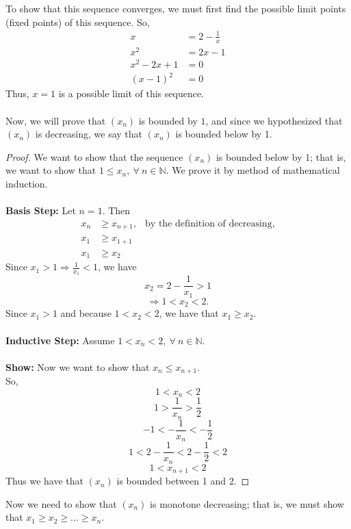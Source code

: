 \documentclass[12pt,letterpaper]{article}
\newcommand{\N}{\mathbb{N}}
\theoremstyle{case}
\theoremstyle{definition}
\begin{document}
\begin{enumerate}
\begin{enumerate}
\begin{enumerate}
			To show that this sequence converges, we must first find the possible limit points (fixed points) of this sequence. So,
			\begin{align*}
				x&=2-\frac{1}{x} \\
				x^2 &= 2x -1 \\
				x^2 - 2x + 1 &= 0 \\
				(x-1)^2 &= 0
			\end{align*}
			Thus, $x=1$ is a possible limit of this sequence.
			\\\\Now, we will prove that $(x_n)$ is bounded by $1$, and since we hypothesized that $(x_n)$ is decreasing, we say that $(x_n)$ is bounded below by 1. 
			\begin{proof}
				We want to show that the sequence $(x_n)$ is bounded below by 1; that is, we want to show that $1 \leq x_n,\ \forall\ n \in \N$. We prove it by method of mathematical induction.
				\\\\\textbf{Basis Step:} Let $n=1$. Then
				\begin{align*}
					x_n &\geq x_{n+1}, &\text{by the definition of decreasing,} \\
					x_1 &\geq x_{1+1} \\
					x_1 &\geq x_2
				\end{align*}
				Since $x_1>1 \Rightarrow \frac{1}{x_1} < 1$, we have
					\[x_2 = 2-\frac{1}{x_1} > 1\]
					\[\Rightarrow 1 < x_2 < 2.\]
				Since $x_1>1$ and because $1 < x_2 < 2$, we have that $x_1 \geq x_2$.
				\\\\\textbf{Inductive Step:} Assume $1 < x_n < 2,\ \forall\ n \in \N$.
				\\\\\textbf{Show:} Now we want to show that $x_n \leq x_{n+1}$.
				\\So,
					\[1 < x_n <2\]
					\[1 > \frac{1}{x_n} > \frac{1}{2}\]
					\[-1 < -\frac{1}{x_n} < -\frac{1}{2}\]
					\[1 < 2-\frac{1}{x_n} < 2-\frac{1}{2} < 2\]
					\[1 < x_{n+1} < 2\]
				Thus we have that $(x_n)$ is bounded between 1 and 2.
			\end{proof}
		
			Now we need to show that $(x_n)$ is monotone decreasing; that is, we must show that $x_1 \geq x_2 \geq \dots \geq x_n$.
			

\end{enumerate}
\end{enumerate}
\end{enumerate}
\end{document}
